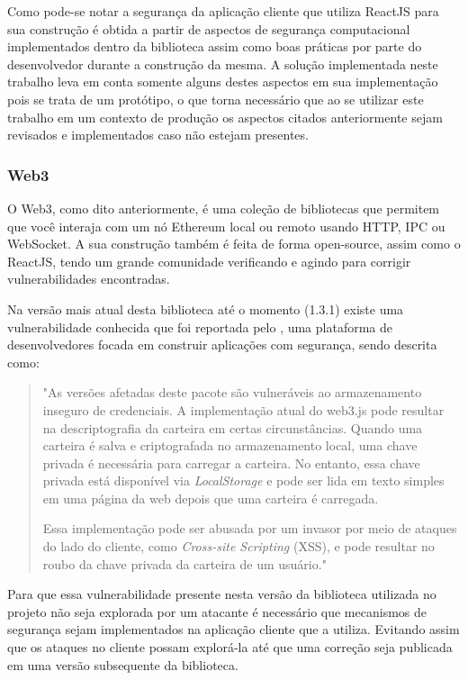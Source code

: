 Como pode-se notar a segurança da aplicação cliente que utiliza ReactJS para sua construção é obtida a partir de aspectos de segurança computacional implementados dentro da biblioteca assim como boas práticas por parte do desenvolvedor durante a construção da mesma. A solução implementada neste trabalho leva em conta somente alguns destes aspectos em sua implementação pois se trata de um protótipo, o que torna necessário que ao se utilizar este trabalho em um contexto de produção os aspectos citados anteriormente sejam revisados e implementados caso não estejam presentes.

\subsubsection{Web3}

O Web3, como dito anteriormente, é uma coleção de bibliotecas que permitem que você interaja com um nó Ethereum local ou remoto usando HTTP, IPC ou WebSocket. A sua construção também é feita de forma open-source, assim como o ReactJS, tendo um grande comunidade verificando e agindo para corrigir vulnerabilidades encontradas.

Na versão mais atual desta biblioteca até o momento (1.3.1) existe uma vulnerabilidade conhecida que foi reportada pelo \citeauthor{snyk_web3vulnerabilities}, uma plataforma de desenvolvedores focada em construir aplicações com segurança, sendo descrita como: 

 \begin{quotation}
 "As versões afetadas deste pacote são vulneráveis ao armazenamento inseguro de credenciais. A implementação atual do web3.js pode resultar na descriptografia da carteira em certas circunstâncias. Quando uma carteira é salva e criptografada no armazenamento local, uma chave privada é necessária para carregar a carteira. No entanto, essa chave privada está disponível via \textit{LocalStorage} e pode ser lida em texto simples em uma página da web depois que uma carteira é carregada.
 
Essa implementação pode ser abusada por um invasor por meio de ataques do lado do cliente, como \textit{Cross-site Scripting} (XSS), e pode resultar no roubo da chave privada da carteira de um usuário."

 \end{quotation}

Para que essa vulnerabilidade presente nesta versão da biblioteca utilizada no projeto não seja explorada por um atacante é necessário que mecanismos de segurança sejam implementados na aplicação cliente que a utiliza. Evitando assim que os ataques no cliente possam explorá-la até que uma correção seja publicada em uma versão subsequente da biblioteca.

